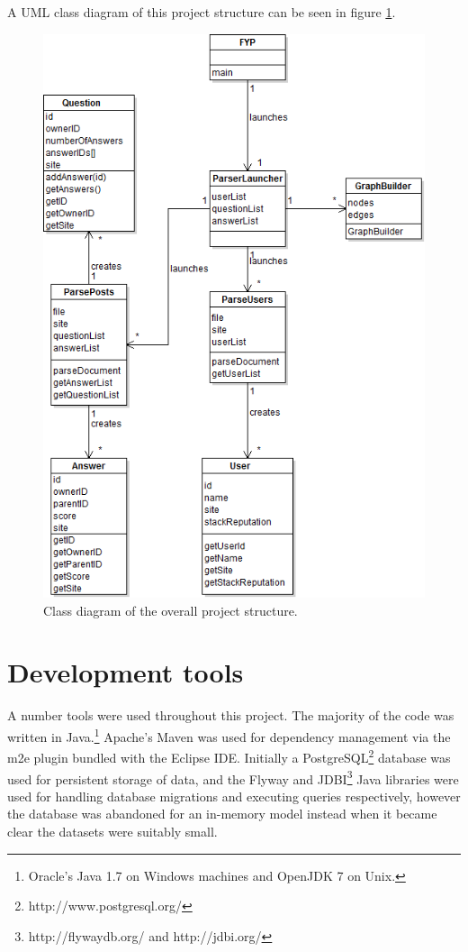 \documentclass[]{final_report}
\begin{document}
A UML class diagram of this project structure can be seen in figure \ref{fig:classdiagram}.
\newpage
\begin{figure}[ht!]
\centering
\includegraphics[width=140mm]{chap4/classdiagram.png}
\caption{Class diagram of the overall project structure.}
\label{fig:classdiagram}
\end{figure}

\newpage
\section{Development tools}

A number tools were used throughout this project. The majority of the code was written in Java.\footnote{Oracle's Java 1.7 on Windows machines and OpenJDK 7 on Unix.} Apache's Maven was used for dependency management via the m2e plugin bundled with the Eclipse IDE. Initially a PostgreSQL\footnote{http://www.postgresql.org/} database was used for persistent storage of data, and the Flyway and JDBI\footnote{http://flywaydb.org/ and http://jdbi.org/} Java libraries were used for handling database migrations and executing queries respectively, however the database was abandoned for an in-memory model instead when it became clear the datasets were suitably small.
\end{document}
